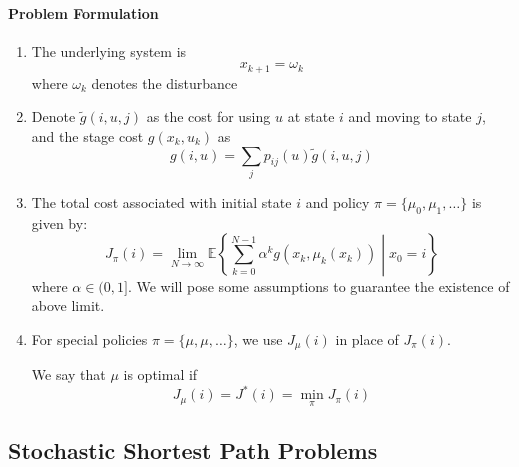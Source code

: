 \paragraph{Problem Formulation}
\begin{enumerate}
\item
The underlying system is 
\[
x_{k+1}=\omega_k
\]
where $\omega_k$ denotes the disturbance
\item
Denote $\tilde{g}(i,u,j)$ as the cost for using $u$ at state $i$ and moving to state $j$, and the stage cost $g(x_k,u_k)$ as
\[
g(i,u) = \sum_jp_{ij}(u)\tilde{g}(i,u,j)
\]
\item
The total cost associated with initial state $i$ and policy $\pi=\{\mu_0,\mu_1,\dots\}$ is given by:
\[
J_{\pi}(i) = \lim_{N\to\infty}\mathbb{E}\left\{
\sum_{k=0}^{N-1}\alpha^kg(x_k,\mu_k(x_k))\middle|x_0=i
\right\}
\]
where $\alpha\in(0,1]$.
We will pose some assumptions to guarantee the existence of above limit.
\item
For special policies $\pi=\{\mu,\mu,\dots\}$, we use $J_{\mu}(i)$ in place of $J_{\pi}(i)$.

We say that $\mu$ is optimal if
\[
J_{\mu}(i)=J^*(i) = \min_{\pi}J_{\pi}(i)
\]
\end{enumerate}




















\subsection{Stochastic Shortest Path Problems}
